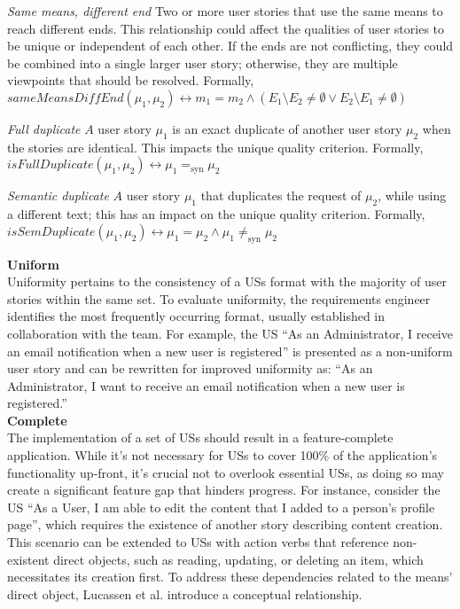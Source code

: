 \begin{definition}
\emph{Same means, different end} Two or more user stories that use the same means to reach different ends. This relationship could affect the qualities of user stories to be unique or independent of each other. If the ends are not conﬂicting, they could be combined into a single larger user story; otherwise, they are multiple viewpoints that should be resolved. Formally,\\ 
$sameMeansDiffEnd(\mu_1, \mu_2) \leftrightarrow m_1 = m_2 \wedge (E_1 \setminus E_2 \neq \emptyset \vee E_2 \setminus E_1 \neq \emptyset )$
\end{definition}
\begin{definition}
\emph{Full duplicate} $A$ user story $\mu_1$ is an exact duplicate of another user story  $\mu_2$ when the stories are identical. This impacts the unique quality criterion. Formally,\\ 
$isFullDuplicate(\mu_1,\mu_2) \leftrightarrow \mu_1 =_{\text{syn}} \mu_2$
\end{definition}
\begin{definition}
\emph{Semantic duplicate} $A$ user story $\mu_1$ that duplicates the request of $\mu_2$, while using a different text; this has an impact on the unique quality criterion. Formally,\\ 
$isSemDuplicate(\mu_1,\mu_2) \leftrightarrow \mu_1 = \mu_2 \wedge \mu_1 \neq _{\text{syn}} \mu_2$
\end{definition}
\textbf{Uniform}\\ 
Uniformity pertains to the consistency of a USs format with the majority of user stories within the same set. To evaluate uniformity, the requirements engineer identifies the most frequently occurring format, usually established in collaboration with the team. For example, the US \enquote{As an Administrator, I receive an email notiﬁcation when a new user is registered} is presented as a non-uniform user story and can be rewritten for improved uniformity as: \enquote{As an Administrator, I want to receive an email notification when a new user is registered.} \\ 
\textbf{Complete}\\ 
The implementation of a set of USs should result in a feature-complete application. While it's not necessary for USs to cover 100\% of the application's functionality up-front, it's crucial not to overlook essential USs, as doing so may create a significant feature gap that hinders progress. For instance, consider the US \enquote{As a User, I am able to edit the content that I added to a person’s proﬁle page}, which requires the existence of another story describing content creation. This scenario can be extended to USs with action verbs that reference non-existent direct objects, such as reading, updating, or deleting an item, which necessitates its creation first. To address these dependencies related to the means' direct object, Lucassen et al. introduce a conceptual relationship. 
 






